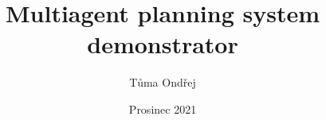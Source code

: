 \worktype [O/EN]
\title {Multiagent planning system demonstrator}
\author {Tůma Ondřej}
\supervisor {\kulich}
\date {Prosinec 2021}